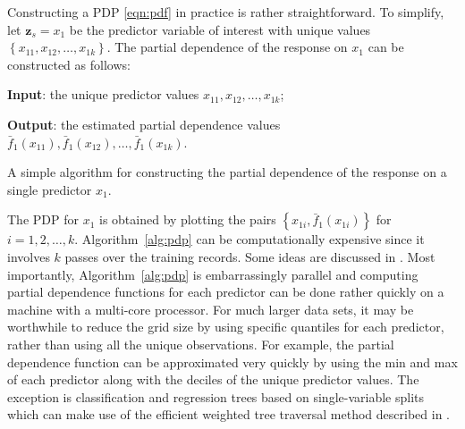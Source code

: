 \documentclass[12pt]{article}
\begin{document}
Constructing a PDP \eqref{eqn:pdf} in practice is rather straightforward. To simplify, let $\boldsymbol{z}_s = x_1$ be the predictor variable of interest with unique values $\left\{x_{11}, x_{12}, \dots, x_{1k}\right\}$. The partial dependence of the response on $x_1$ can be constructed as follows:
\begin{algorithm}
  \textbf{Input}: the unique predictor values $x_{11}, x_{12}, \dots, x_{1k}$;

  \textbf{Output}: the estimated partial dependence values $\bar{f}_1\left(x_{11}\right), \bar{f}_1\left(x_{12}\right), \dots, \bar{f}_1\left(x_{1k}\right)$. \BlankLine
    \BlankLine
    \BlankLine
  \caption{A simple algorithm for constructing the partial dependence of the response on a single predictor $x_1$. \label{alg:pdp}}
\end{algorithm}

The PDP for $x_1$ is obtained by plotting the pairs $\left\{x_{1i}, \bar{f}_1\left(x_{1i}\right)\right\}$ for $i = 1, 2, \dotsc, k$. Algorithm~\eqref{alg:pdp} can be computationally expensive since it involves $k$ passes over the training records. Some ideas are discussed in \citet{pdp-greenwell-2017}. Most importantly, Algorithm~\eqref{alg:pdp} is embarrassingly parallel and computing partial dependence functions for each predictor can be done rather quickly on a machine with a multi-core processor. For much larger data sets, it may be worthwhile to reduce the grid size by using specific quantiles for each predictor, rather than using all the unique observations. For example, the partial dependence function can be approximated very quickly by using the min and max of each predictor along with the deciles of the unique predictor values. The exception is classification and regression trees based on single-variable splits which can make use of the efficient weighted tree traversal method described in \citet{friedman-2001-greedy}.
\end{document}
